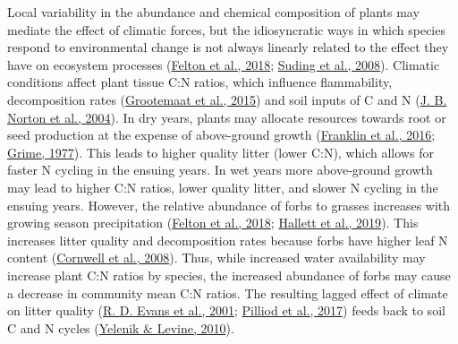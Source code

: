 \documentclass[
  11pt,
  a4paper,
]{article}
\begin{document}
Local variability in the abundance and chemical composition of plants may mediate the effect of climatic forces, but the idiosyncratic ways in which species respond to environmental change is not always linearly related to the effect they have on ecosystem processes (\protect\hyperlink{ref-Felton2018}{Felton et al., 2018}; \protect\hyperlink{ref-Suding2008}{Suding et al., 2008}). Climatic conditions affect plant tissue C:N ratios, which influence flammability, decomposition rates (\protect\hyperlink{ref-Grootemaat2015}{Grootemaat et al., 2015}) and soil inputs of C and N (\protect\hyperlink{ref-Norton2004}{J. B. Norton et al., 2004}). In dry years, plants may allocate resources towards root or seed production at the expense of above-ground growth (\protect\hyperlink{ref-Franklin2016}{Franklin et al., 2016}; \protect\hyperlink{ref-Grime1977}{Grime, 1977}). This leads to higher quality litter (lower C:N), which allows for faster N cycling in the ensuing years. In wet years more above-ground growth may lead to higher C:N ratios, lower quality litter, and slower N cycling in the ensuing years. However, the relative abundance of forbs to grasses increases with growing season precipitation (\protect\hyperlink{ref-Felton2018}{Felton et al., 2018}; \protect\hyperlink{ref-Hallett2019}{Hallett et al., 2019}). This increases litter quality and decomposition rates because forbs have higher leaf N content (\protect\hyperlink{ref-Cornwell2008}{Cornwell et al., 2008}). Thus, while increased water availability may increase plant C:N ratios by species, the increased abundance of forbs may cause a decrease in community mean C:N ratios. The resulting lagged effect of climate on litter quality (\protect\hyperlink{ref-Evans2001}{R. D. Evans et al., 2001}; \protect\hyperlink{ref-Pilliod2017}{Pilliod et al., 2017}) feeds back to soil C and N cycles (\protect\hyperlink{ref-Yelenik2010}{Yelenik \& Levine, 2010}).
\end{document}

